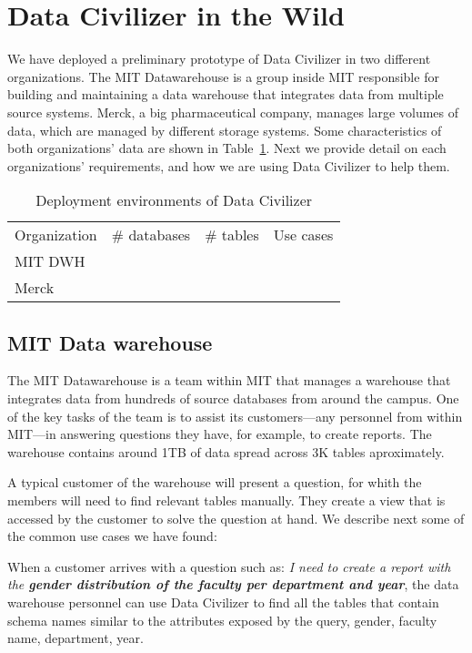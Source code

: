 \section{Data Civilizer in the Wild}
\label{sec:wild}

We have deployed a preliminary prototype of Data Civilizer in two different
organizations. The MIT Datawarehouse is a group inside MIT responsible for
building and maintaining a data warehouse that integrates data from multiple
source systems. Merck, a big pharmaceutical company, manages large volumes of
data, which are managed by different storage systems. Some characteristics of
both organizations' data are shown in Table~\ref{tab:dataCivInTheWild}. Next we
provide detail on each organizations' requirements, and how we are using Data
Civilizer to help them.

\begin{table}
\caption{Deployment environments of Data Civilizer}\label{tab:dataCivInTheWild}
\begin{tabular}{|l|l|l|l|}
\hline
Organization & \# databases & \# tables & Use cases\\
MIT DWH & & & \\
Merck & & & \\
\hline
\end{tabular}
\end{table}

\subsection{MIT Data warehouse}

The MIT Datawarehouse is a team within MIT that manages a warehouse that
integrates data from hundreds of source databases from around the campus. One of
the key tasks of the team is to assist its customers---any personnel from within
MIT---in answering questions they have, for example, to create reports. The
warehouse contains around 1TB of data spread across 3K tables aproximately.

A typical customer of the warehouse will present a question, for whith the
members will need to find relevant tables manually. They create a view that is
accessed by the customer to solve the question at hand. We describe next some of
the common use cases we have found:

 When a customer arrives with a question such as:
\emph{I need to create a report with the \textbf{gender distribution of the faculty per
department and year}}, the data warehouse personnel can use Data Civilizer to
find all the tables that contain schema names similar to the attributes exposed
by the query, \eg gender, faculty name, department, year. 

